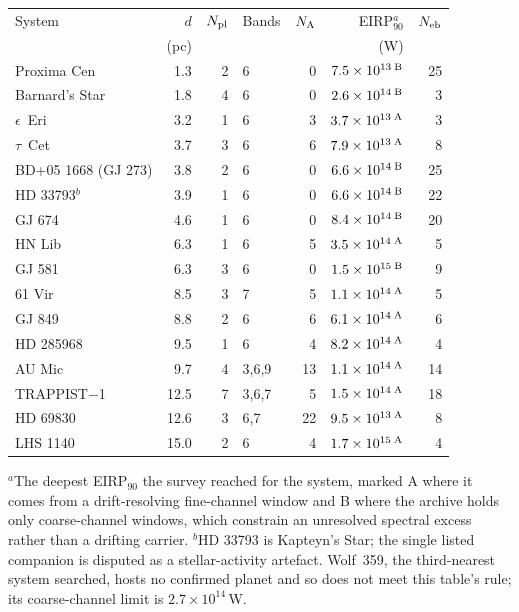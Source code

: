 \begin{tabular}{@{}l@{~~}r@{~~}r@{~~}l@{~~}r@{~~}r@{~~}r@{}}
\hline
System & $d$ & $N_{\rm pl}$ & Bands & $N_{\rm A}$ & EIRP$_{90}^{a}$ & $N_{\rm eb}$ \\
 & (pc) & & & & (W) & \\
\hline
Proxima Cen & 1.3 & 2 & 6 & 0 & $7.5\times10^{13}\,^{\rm B}$ & 25 \\
Barnard's Star & 1.8 & 4 & 6 & 0 & $2.6\times10^{14}\,^{\rm B}$ & 3 \\
$\epsilon$~Eri & 3.2 & 1 & 6 & 3 & $3.7\times10^{13}\,^{\rm A}$ & 3 \\
$\tau$~Cet & 3.7 & 3 & 6 & 6 & $7.9\times10^{13}\,^{\rm A}$ & 8 \\
BD+05 1668 (GJ 273) & 3.8 & 2 & 6 & 0 & $6.6\times10^{14}\,^{\rm B}$ & 25 \\
HD 33793$^{b}$ & 3.9 & 1 & 6 & 0 & $6.6\times10^{14}\,^{\rm B}$ & 22 \\
GJ 674 & 4.6 & 1 & 6 & 0 & $8.4\times10^{14}\,^{\rm B}$ & 20 \\
HN Lib & 6.3 & 1 & 6 & 5 & $3.5\times10^{14}\,^{\rm A}$ & 5 \\
GJ 581 & 6.3 & 3 & 6 & 0 & $1.5\times10^{15}\,^{\rm B}$ & 9 \\
61 Vir & 8.5 & 3 & 7 & 5 & $1.1\times10^{14}\,^{\rm A}$ & 5 \\
GJ 849 & 8.8 & 2 & 6 & 6 & $6.1\times10^{14}\,^{\rm A}$ & 6 \\
HD 285968 & 9.5 & 1 & 6 & 4 & $8.2\times10^{14}\,^{\rm A}$ & 4 \\
AU Mic & 9.7 & 4 & 3,6,9 & 13 & $1.1\times10^{14}\,^{\rm A}$ & 14 \\
TRAPPIST$-$1 & 12.5 & 7 & 3,6,7 & 5 & $1.5\times10^{14}\,^{\rm A}$ & 18 \\
HD 69830 & 12.6 & 3 & 6,7 & 22 & $9.5\times10^{13}\,^{\rm A}$ & 8 \\
LHS 1140 & 15.0 & 2 & 6 & 4 & $1.7\times10^{15}\,^{\rm A}$ & 4 \\
\hline
\end{tabular}

{\footnotesize $^{a}$The deepest EIRP$_{90}$ the survey reached for the system, marked A where it comes from a drift-resolving fine-channel window and B where the archive holds only coarse-channel windows, which constrain an unresolved spectral excess rather than a drifting carrier. $^{b}$HD 33793 is Kapteyn's Star; the single listed companion is disputed as a stellar-activity artefact. Wolf~359, the third-nearest system searched, hosts no confirmed planet and so does not meet this table's rule; its coarse-channel limit is $2.7\times10^{14}$\,W.}
